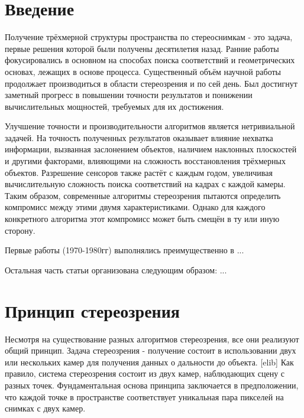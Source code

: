 





\tableofcontents
\newpage


\section{Введение}

Получение трёхмерной структуры пространства по стереоснимкам - это задача, первые решения которой
были получены десятилетия назад. Ранние работы фокусировались в основном на способах поиска соответствий
и геометрических основах, лежащих в основе процесса. Существенный объём научной работы продолжает
 производиться в области стереозрения и по сей день. Был достигнут заметный прогресс в повышении точности результатов и понижении вычислительных мощностей, требуемых для 
их достижения. 

Улучшение точности и производительности алгоритмов является нетривиальной задачей. На точность 
полученных результатов оказывает влияние нехватка информации, вызванная заслонением объектов, наличием наклонных
плоскостей и другими факторами, влияющими на сложность восстановления трёхмерных объектов. Разрешение
сенсоров также растёт с каждым годом, увеличивая вычислительную сложность поиска соответствий на кадрах с 
каждой камеры. Таким образом, современные алгоритмы стереозрения пытаются определить компромисс между этими
 двумя характеристиками. Однако для каждого конкретного алгоритма этот компромисс может быть смещён в 
 ту или иную сторону. 



Первые работы (1970-1980гг) выполнялись преимущественно в ...


Остальная часть статьи организована следующим образом:
...

\section{Принцип стереозрения}

Несмотря на существование разных алгоритмов стереозрения, все они реализуют общий принцип. Задача стереозрения - 
получение состоит в использовании двух или нескольких камер для получения данных о дальности до объекта. [elib] 
Как правило, система стереозрения состоит из двух камер, наблюдающих сцену с разных точек. Фундаментальная основа принципа
заключается в предположении, что каждой точке в пространстве соответствует уникальная пара пикселей на снимках с двух камер.  


